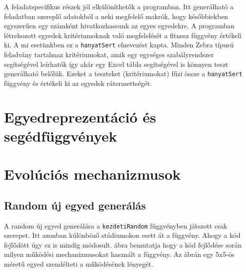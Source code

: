 \documentclass[12ppt,a4paper,oneside]{report}
\begin{document}
			
			{A feladatspecifikus részek jól elkülöníthetők a programban. Itt generálható a feladatban szereplő adatokból a neki megfelelő makrók, hogy későbbiekben egyszerűen egy számként hivatkozhassunk az egyes egyedekre. A programban létrehozott egyedek kritériumoknak való megfelelését a fitnesz függvény értékeli ki. A mi esetünkben ez a \texttt{hanyatSert} elnevezést kapta. Minden Zebra típusú feladvány tartalmaz kritériumokat, amik egy egységes szabályrendszer segítségével leírhatók így akár egy Excel tábla segítségével is könnyen teszt generálható belőlük. Ezeket a teszteket (kritériumokat) fűzi össze a \texttt{hanyatSert} függvény és értékeli ki az egyedek rátermettségét.}

    \section{Egyedreprezentáció és segédfüggvények} %

    \section{Evolúciós mechanizmusok} %
        
        \subsection{Random új egyed generálás} %
        
         {A random új egyed generálása a \texttt{kezdetiRandom} függvényben játszott csak szerepet. Itt azonban különböző stádiumokon esett át a függvény. Ahogy a kód fejlődött úgy ez is mindig módosult.  ábra bemutatja hogy a kód fejlődése során milyen működési mechanizmusokat használt a függvény. Az ábrán egy 5x5-ös méretű egyed szemlélteti a működésének lényegét.}
         
           
\end{document}

